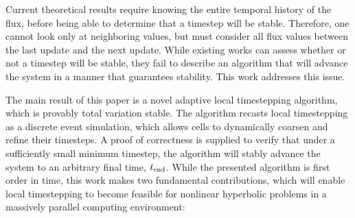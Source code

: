 Current theoretical results require knowing the entire temporal history of the flux, before being able to determine that a timestep will be stable. Therefore, one cannot look only at neighboring values, but must consider all flux values between the last update and the next update. While existing works can assess whether or not a timestep will be stable, they fail to describe an algorithm that will advance the system in a manner that guarantees stability. This work addresses this issue.


The main result of this paper is a novel adaptive local timestepping algorithm, which is provably total variation stable. The algorithm recasts local timestepping as a discrete event simulation, which allows cells to dynamically coarsen and refine their timesteps. A proof of correctness is supplied to verify that under a sufficiently small minimum timestep, the algorithm will stably advance the system to an arbitrary final time, $t_{\text{end}}$. While the presented algorithm is first order in time, this work makes two fundamental contributions, which will enable local timestepping to become feasible for nonlinear hyperbolic problems in a massively parallel computing environment:
